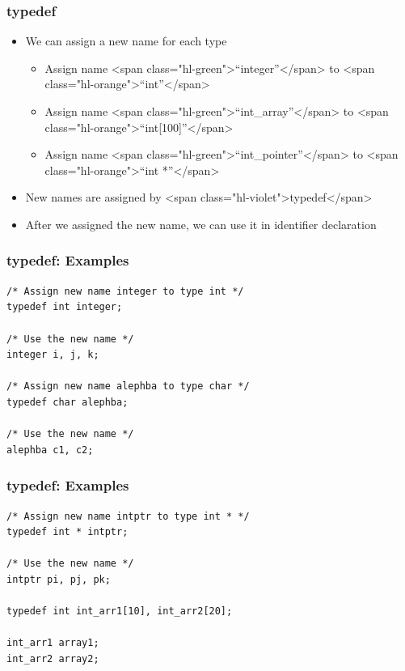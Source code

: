 \documentclass{../c-lecture}
\begin{document}
\begin{frame}
  \frametitle{typedef}
  \begin{itemize}
    \item We can assign a new name for each type
    \begin{itemize}
      \item
        Assign name <span class="hl-green">“integer”</span> to
        <span class="hl-orange">“int”</span>

      \item
        Assign name <span class="hl-green">“int\_array”</span> to
        <span class="hl-orange">“int[100]”</span>

      \item
        Assign name <span class="hl-green">“int\_pointer”</span> to
        <span class="hl-orange">“int *”</span>

    \end{itemize}
    \item New names are assigned by <span class="hl-violet">typedef</span>
    \item
      After we assigned the new name, we can use it in identifier declaration

  \end{itemize}
\end{frame}

\begin{frame}[fragile]
  \frametitle{typedef: Examples}
  \begin{verbatim}
/* Assign new name integer to type int */
typedef int integer;

/* Use the new name */
integer i, j, k;

/* Assign new name alephba to type char */
typedef char alephba;

/* Use the new name */
alephba c1, c2;
  \end{verbatim}
\end{frame}

\begin{frame}[fragile]
  \frametitle{typedef: Examples}
  \begin{verbatim}
/* Assign new name intptr to type int * */
typedef int * intptr;

/* Use the new name */
intptr pi, pj, pk;

typedef int int_arr1[10], int_arr2[20];

int_arr1 array1;
int_arr2 array2;
  \end{verbatim}
\end{frame}
\end{document}
